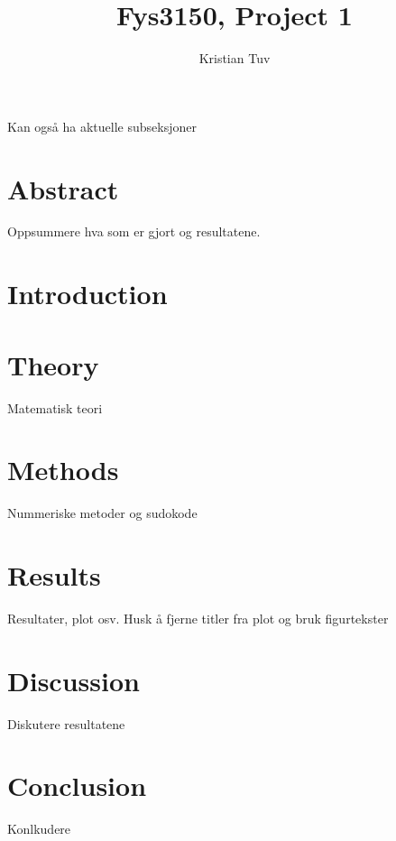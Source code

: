 \documentclass[a4paper, norsk, 12pt]{article}
\begin{document}
\author{Kristian Tuv}
\title{Fys3150, Project 1}
\maketitle
Kan også ha aktuelle subseksjoner
\section*{Abstract}
Oppsummere hva som er gjort og resultatene.
\section*{Introduction}
\section*{Theory}
Matematisk teori
\section*{Methods}
Nummeriske metoder og sudokode
\section*{Results}
Resultater, plot osv. Husk å fjerne titler fra plot og bruk figurtekster
\section*{Discussion}
Diskutere resultatene
\section*{Conclusion}
Konlkudere
\end{document}
